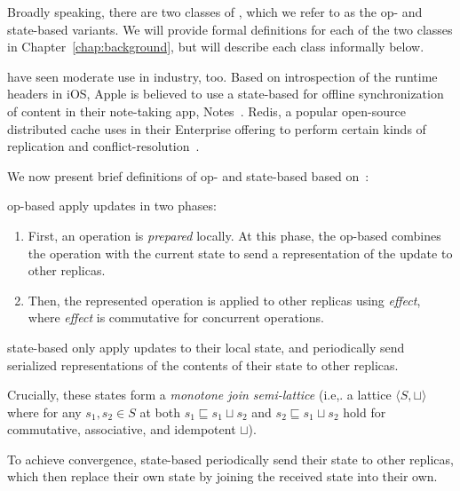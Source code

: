 Broadly speaking, there are two classes of \CRDTs, which we refer to as the op-
and state-based variants. We will provide formal definitions for each of the two
classes in Chapter~\ref{chap:background}, but will describe each class
informally below.

\CRDTs have seen moderate use in industry, too. Based on introspection of the
runtime headers in iOS, Apple is believed to use a state-based \CRDT for offline
synchronization of content in their note-taking app, Notes~\citep{applenotes}.
Redis, a popular open-source distributed cache uses \CRDTs in their Enterprise
offering to perform certain kinds of replication and
conflict-resolution~\citep{redis}.

We now present brief definitions of op- and state-based \CRDTs based
on~\citet{baquero14}:

\begin{definition}
  op-based \CRDTs apply updates in two phases:
  \begin{enumerate}
    \item First, an operation is \emph{prepared} locally. At this phase, the
      op-based \CRDT combines the operation with the current state to send a
      representation of the update to other replicas.
    \item Then, the represented operation is applied to other replicas using
      \emph{effect}, where \emph{effect} is commutative for concurrent
      operations.
  \end{enumerate}
\end{definition}

\begin{definition}
  state-based \CRDTs only apply updates to their local state, and periodically
  send serialized representations of the contents of their state to other
  replicas.

  Crucially, these states form a \textit{monotone join semi-lattice} (i.e,. a
  lattice $\langle S, \sqcup \rangle$ where for any $s_1, s_2 \in S$ at both
  $s_1 \sqsubseteq s_1 \sqcup s_2$ and $s_2 \sqsubseteq s_1 \sqcup s_2$ hold for
  commutative, associative, and idempotent $\sqcup$).

  To achieve convergence, state-based \CRDTs periodically send their state to
  other replicas, which then replace their own state by joining the received
  state into their own.
\end{definition}

